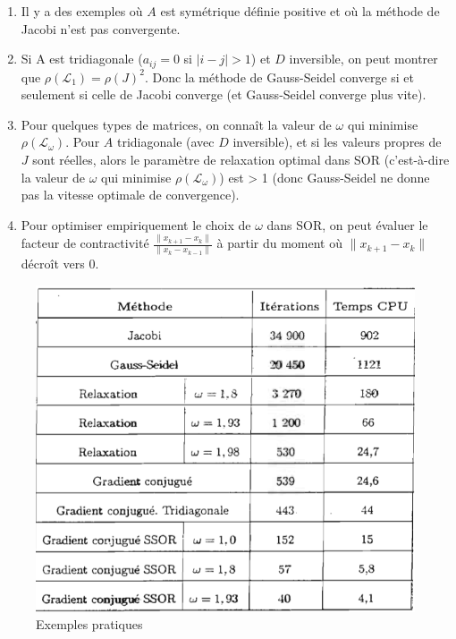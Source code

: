 \documentclass[a4paper,11pt]{article}
\newcommand{\abs}[1]{\left\lvert#1\right\rvert}
\theoremstyle{plain} %
\begin{document}
\begin{remark}
    \begin{enumerate}
        \item Il y a des exemples où $A$ est symétrique définie positive et où la méthode de Jacobi n'est pas convergente.
        \item Si A est tridiagonale ($a_{ij}=0$ si $\abs{i-j}>1$) et $D$ inversible, on peut montrer que $\rho(\mathcal{L}_1)=\rho(J)^2$. Donc la méthode de Gauss-Seidel converge si et seulement si celle de Jacobi converge (et Gauss-Seidel converge plus vite).
        \item  Pour quelques types de matrices, on connaît la valeur de $\omega$ qui minimise $\rho (\mathcal{L}_{\omega})$.
            Pour $A$ tridiagonale (avec $D$ inversible), et si les valeurs propres de $J$ sont réelles, alors le paramètre de relaxation optimal dans SOR (c'est-à-dire la valeur de $\omega$ qui minimise $\rho (\mathcal{L}_{\omega})$) est > 1 (donc Gauss-Seidel ne donne pas la vitesse optimale de convergence).
        \item Pour optimiser empiriquement le choix de $\omega$ dans SOR, on peut évaluer le facteur de contractivité $\frac{\| x_{k+1} - x_k\|}{\| x_k - x_{k-1}\|}$ à partir du moment où $\|x_{k+1}-x_{k}\|$ décroît vers 0.
    \end{enumerate}
\end{remark}

\begin{figure}[]
    \centering
    \includegraphics[scale=0.5]{tableau.png}
    \caption{Exemples pratiques}
    \label{fig:tableau}
\end{figure}
\end{document}
